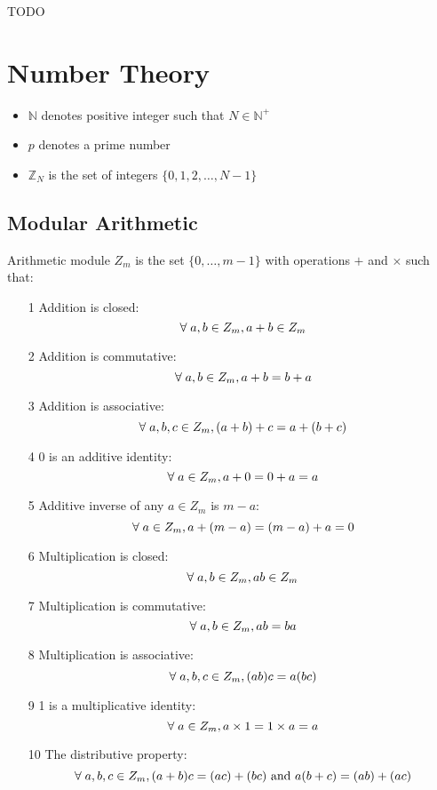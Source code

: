 \documentclass[a4paper]{article}
\begin{document}
TODO

\section{Number Theory}

\begin{itemize}
  \item $\mathbb{N}$ denotes positive integer such that $N \in \mathbb{N}^{+}$
  \item $p$ denotes a prime number
  \item $\mathbb{Z}_{N}$ is the set of integers $\{0, 1, 2, \ldots, N-1\}$
\end{itemize}

\subsection{Modular Arithmetic}

Arithmetic module $Z_{m}$ is the set $\{0, \ldots, m-1\}$ with operations
$+$ and $\times$ such that:

\begin{enumerate}
  \item[1] Addition is closed:
           \[\;\forall\; a, b \in Z_{m}, a + b \in Z_{m}\]
  \item[2] Addition is commutative: \\
           \[\;\forall\; a, b \in Z_{m}, a + b = b + a\]
  \item[3] Addition is associative: \\
           \[\;\forall\; a, b, c \in Z_{m}, (a + b) + c = a + (b + c)\]
  \item[4] 0 is an additive identity: \\
           \[\;\forall\; a \in Z_{m}, a + 0 = 0 + a = a\]
  \item[5] Additive inverse of any $a \in Z_{m}$ is $m - a$: \\
           \[\;\forall\; a \in Z_{m}, a + (m - a) = (m - a) + a = 0\]
  \item[6] Multiplication is closed: \\
           \[\;\forall\; a, b \in Z_{m}, ab \in Z_{m}\]
  \item[7] Multiplication is commutative: \\
           \[\;\forall\; a, b \in Z_{m}, ab = ba\]
  \item[8] Multiplication is associative:\\
           \[\;\forall\; a, b, c \in Z_{m}, (ab)c = a(bc)\]
  \item[9] 1 is a multiplicative identity:
           \[\;\forall\; a \in Z_{m}, a \times 1 = 1 \times a = a\]
  \item[10] The distributive property:
           \[\;\forall\; a, b, c \in Z_{m}, (a + b)c = (ac) + (bc) \ \mathrm{and} \ a(b + c) = (ab) + (ac)\]
\end{enumerate}
\end{document}

